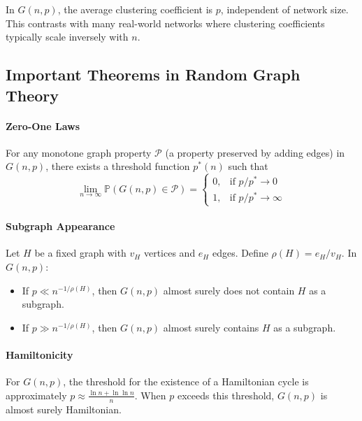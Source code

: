 \documentclass[oneside]{book}
\begin{document}
\begin{theorem}
In $G(n,p)$, the average clustering coefficient is $p$, independent of network size. This contrasts with many real-world networks where clustering coefficients typically scale inversely with $n$.
\end{theorem}

\subsection{Important Theorems in Random Graph Theory}

\paragraph{Zero-One Laws}
\begin{theorem}
For any monotone graph property $\mathcal{P}$ (a property preserved by adding edges) in $G(n,p)$, there exists a threshold function $p^*(n)$ such that
\[
\lim_{n\to\infty} \mathbb{P}(G(n,p) \in \mathcal{P}) = 
\begin{cases}
0, & \text{if } p/p^* \to 0 \\
1, & \text{if } p/p^* \to \infty
\end{cases}
\]
\end{theorem}

\paragraph{Subgraph Appearance}
\begin{theorem}
Let $H$ be a fixed graph with $v_H$ vertices and $e_H$ edges. Define $\rho(H) = e_H/v_H$. In $G(n,p)$:
\begin{itemize}
\item If $p \ll n^{-1/\rho(H)}$, then $G(n,p)$ almost surely does not contain $H$ as a subgraph.
\item If $p \gg n^{-1/\rho(H)}$, then $G(n,p)$ almost surely contains $H$ as a subgraph.
\end{itemize}
\end{theorem}

\paragraph{Hamiltonicity}
\begin{theorem}
For $G(n,p)$, the threshold for the existence of a Hamiltonian cycle is approximately $p \approx \frac{\ln n + \ln \ln n}{n}$. When $p$ exceeds this threshold, $G(n,p)$ is almost surely Hamiltonian.
\end{theorem}
\end{document}
